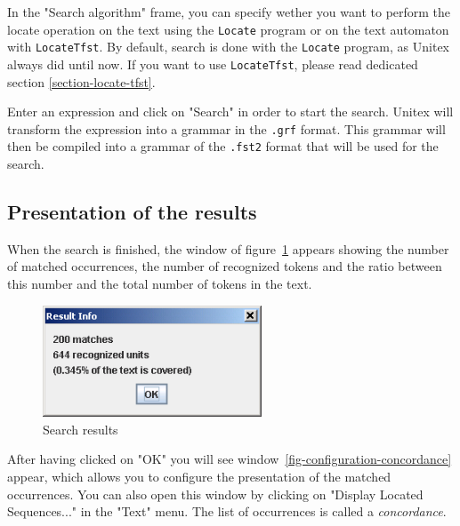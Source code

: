 \bigskip
\noindent In the "Search algorithm" frame, you can specify wether you want to
perform the locate operation on the text using the \verb+Locate+ program or on
the text automaton with \verb+LocateTfst+. By default, search is done with the
\verb+Locate+ program, as Unitex always did until now. If you want to use
\verb+LocateTfst+, please read dedicated section \ref{section-locate-tfst}.

\bigskip
\noindent Enter an expression and click on "Search" in order to start the
search. Unitex will transform the expression into a grammar in the \verb+.grf+ format.
 This grammar will then be compiled into a grammar of
the \verb+.fst2+ format that will be used for the
search.

\subsection{Presentation of the results}
\label{section-display-occurrences}
When the search is finished, the window of
figure~\ref{fig-search-results} appears showing the number of matched
occurrences, the number of recognized tokens and the ratio between this number and the total number of
tokens in the text.

\bigskip
\begin{figure}[h]
\begin{center}
\includegraphics[width=6.5cm]{resources/img/fig4-5.png}
\caption{Search results \label{fig-search-results}}
\end{center}
\end{figure}

\noindent After having clicked on "OK" you will see
window~\ref{fig-configuration-concordance} appear, which allows you to configure
the presentation of the matched occurrences. You can also open this window by
clicking on "Display Located Sequences..." in the "Text" menu. The list of
occurrences is called a \textit{concordance}.



